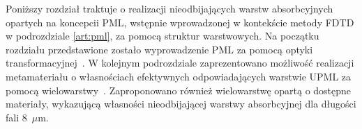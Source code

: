 Poniższy rozdział traktuje o realizacji nieodbijających warstw absorbcyjnych opartych na koncepcii PML, wstępnie wprowadzonej w kontekście metody FDTD w podrozdziale \ref{art:pml}, za pomocą struktur warstwowych. Na początku rozdziału przedstawione zostało wyprowadzenie PML za pomocą optyki transformacyjnej~\cite{pendry2012transformation}. W kolejnym podrozdziale zaprezentowano możliwość realizacji metamateriału o własnościach efektywnych odpowiadających warstwie UPML za pomocą wielowarstwy~\cite{ania2015}. Zaproponowano również wielowarstwę opartą o dostępne materiały, wykazującą własności nieodbijającej warstwy absorbcyjnej dla długości fali $8$~$\mu$m.



